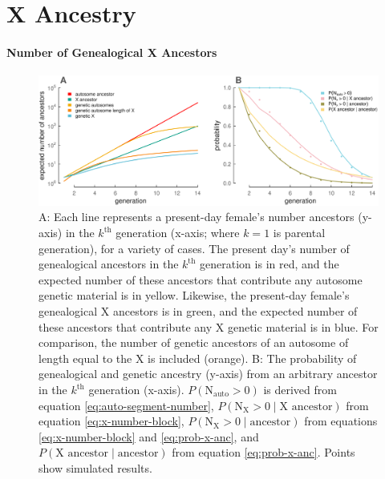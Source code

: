 \documentclass[11pt]{article}
\begin{document}
\section{X Ancestry}
\label{sec:x-ancestry}

\paragraph{Number of Genealogical X Ancestors}

  \begin{figure}[!ht]
    \centering
    \includegraphics[width=\textwidth]{images/num-ancestors}

    \caption{A: Each line represents a present-day female's number ancestors
(y-axis) in the $k^\text{th}$ generation (x-axis; where $k=1$ is parental
generation), for a variety of cases. The present day's number of genealogical
ancestors in the $k^\text{th}$ generation is in red, and the expected number of
these ancestors that contribute any autosome genetic material is in yellow.
Likewise, the present-day female's genealogical X ancestors is in green, and
the expected number of these ancestors that contribute any X genetic material
is in blue. For comparison, the number of genetic ancestors of an autosome of
length equal to the X is included (orange).  B: The probability of genealogical
and genetic ancestry (y-axis) from an arbitrary ancestor in the $k^\text{th}$
generation (x-axis). $P(\text{N}_\text{auto} > 0)$ is derived from equation
\eqref{eq:auto-segment-number}, $P(\text{N}_\text{X} > 0 \;|\; \text{X
ancestor})$ from equation \eqref{eq:x-number-block}, $P(\text{N}_\text{X} > 0
\;|\; \text{ancestor})$ from equations \eqref{eq:x-number-block} and
\eqref{eq:prob-x-anc}, and $P(\text{X ancestor} \;|\; \text{ancestor})$ from
equation \eqref{eq:prob-x-anc}. Points show simulated results.}

\label{fig:num-ancestors}
\end{figure}
\end{document}
